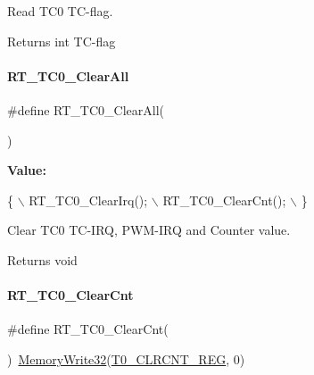 Read T\+C0 T\+C-\/flag. 

\begin{DoxyReturn}{Returns}
int T\+C-\/flag 
\end{DoxyReturn}
\mbox{\label{a00041_a455c100511141b1243e8ee7f756e6553}} 
\paragraph{\texorpdfstring{R\+T\+\_\+\+T\+C0\+\_\+\+Clear\+All}{RT\_TC0\_ClearAll}}
{\footnotesize\ttfamily \#define R\+T\+\_\+\+T\+C0\+\_\+\+Clear\+All(\begin{DoxyParamCaption}{ }\end{DoxyParamCaption})}

{\bfseries Value\+:}
\begin{DoxyCode}
\{                      \(\backslash\)
        RT\_TC0\_ClearIrq(); \(\backslash\)
        RT\_TC0\_ClearCnt(); \(\backslash\)
    \}
\end{DoxyCode}


Clear T\+C0 T\+C-\/\+I\+RQ, P\+W\+M-\/\+I\+RQ and Counter value. 

\begin{DoxyReturn}{Returns}
void 
\end{DoxyReturn}
\mbox{\label{a00041_a17c2c2161dfc43f81e4e887a0d2b62ee}} 
\paragraph{\texorpdfstring{R\+T\+\_\+\+T\+C0\+\_\+\+Clear\+Cnt}{RT\_TC0\_ClearCnt}}
{\footnotesize\ttfamily \#define R\+T\+\_\+\+T\+C0\+\_\+\+Clear\+Cnt(\begin{DoxyParamCaption}{ }\end{DoxyParamCaption})~\mbox{\hyperlink{a00020_a6b9732365b12e48ddb89fe1028b975b0}{Memory\+Write32}}(\mbox{\hyperlink{a00020_adadaa0ab1ebbd7ba9b70dfd24c3ed44da420bf6168c45c07b5b47903f3409acc7}{T0\+\_\+\+C\+L\+R\+C\+N\+T\+\_\+\+R\+EG}}, 0)}



